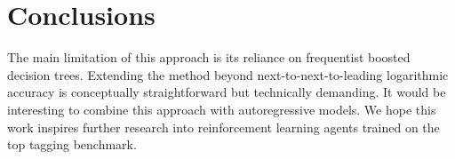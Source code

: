 \section{Conclusions}\label{sec:conclusions}

The main limitation of this approach is its reliance on frequentist
boosted decision trees. Extending the method beyond
next-to-next-to-leading logarithmic accuracy is conceptually
straightforward but technically demanding. It would be interesting to
combine this approach with autoregressive models. We hope this work
inspires further research into reinforcement learning agents trained on
the top tagging benchmark.


